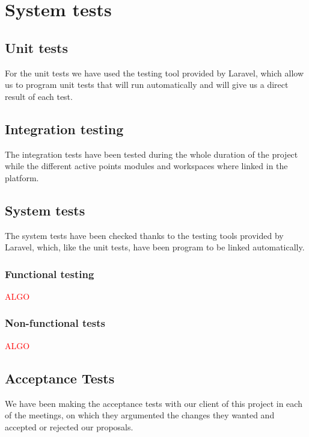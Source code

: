 \chapter{System tests}
\section{Unit tests}
For the unit tests we have used the testing tool provided by Laravel, which allow us to program unit tests that will run automatically and will give us a direct result of each test.

\section{Integration testing}
The integration tests have been tested during the whole duration of the project while the different active points modules and workspaces where linked in the platform.

\section{System tests}
The system tests have been checked thanks to the testing tools provided by Laravel, which, like the unit tests, have been program to be linked automatically.

\subsection{Functional testing}
\textcolor{red}{ALGO}

\subsection{Non-functional tests}
\textcolor{red}{ALGO}

\section{Acceptance Tests}
We have been making the acceptance tests with our client of this project in each of the meetings, on which they argumented the changes they wanted and accepted or rejected our proposals.